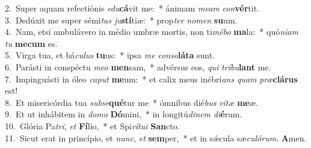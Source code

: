 {2.~}Super aquam refectiónis \textit{e}\textit{du}\textbf{cá}vit me:~* ánimam \textit{me}\textit{am} \textit{con}\textbf{vér}tit.\\
{3.~}Dedúxit me super sémi\textit{tas} \textit{ju}\textbf{stí}tiæ:~* prop\textit{ter} \textit{no}\textit{men} \textbf{su}um.\\
{4.~}Nam, etsi ambulávero in médio umbræ mortis, non ti\textit{mé}\textit{bo} \textbf{ma}la:~* quó\textit{ni}\textit{am} \textit{tu} \textbf{me}\textbf{cum} es.\\
{5.~}Virga tua, et bá\textit{cu}\textit{lus} \textbf{tu}us:~* ipsa \textit{me} \textit{con}\textit{so}\textbf{lá}\textbf{ta} sunt.\\
{6.~}Parásti in conspéctu \textit{me}\textit{o} \textbf{men}sam,~* advérsus eos, \textit{qui} \textit{trí}\textit{bu}\textbf{lant} me.\\
{7.~}Impinguásti in óleo \textit{ca}\textit{put} \textbf{me}um:~* et calix meus inébri\textit{ans} \textit{quam} \textit{præ}\textbf{clá}\textbf{rus} est!\\
{8.~}Et misericórdia tua \textit{sub}\textit{se}\textbf{qué}tur me~* ómnibus dié\textit{bus} \textit{vi}\textit{tæ} \textbf{me}æ.\\
{9.~}Et ut inhábitem in \textit{do}\textit{mo} \textbf{Dó}mini,~* in longitú\textit{di}\textit{nem} \textit{di}\textbf{é}rum.\\
{10.~}Glória Pa\textit{tri}, \textit{et} \textbf{Fí}lio,~* et Spi\textit{rí}\textit{tu}\textit{i} \textbf{San}cto.\\
{11.~}Sicut erat in princípio, et \textit{nunc}, \textit{et} \textbf{sem}per,~* et in sǽcula sæ\textit{cu}\textit{ló}\textit{rum}. \textbf{A}men.\\

